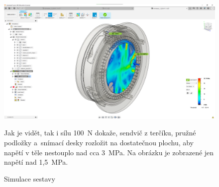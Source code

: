 \begin{figure}
    \centering
    \includegraphics[width=\textwidth]{kapitoly/obrazky/E4/machanika_tlakove_desky/simulace/zjednodusena_sestava_pri_F100N_nezobrazeno_napeti_pod_1,5MPa.png}
    \caption{Simulace sestavy}
    Jak je vidět, tak i sílu 100~N dokaže, sendvič z terčíku, pružné podložky a~snímací desky rozložit na dostatečnou plochu, aby napětí v těle nestouplo 
    nad cca 3~MPa. Na obrázku je zobrazené jen napětí nad 1,5~MPa.
    \label{fig:E4-simulace_tlakovky}
\end{figure}

